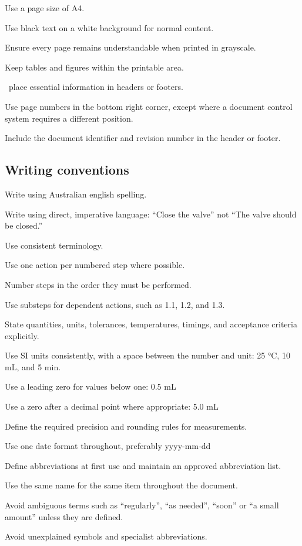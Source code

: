 Use a page size of A4.

Use black text on a white background for normal content.

Ensure every page remains understandable when printed in grayscale.

Keep tables and figures within the printable area.

\donot~place essential information in headers or footers.

Use page numbers in the bottom right corner, except where a document control system requires a different position.

Include the document identifier and revision number in the header or footer.

\subsection{Writing conventions}

Write using Australian english spelling.

Write using direct, imperative language: “Close the valve” not “The valve should be closed.”

Use consistent terminology.

Use one action per numbered step where possible.

Number steps in the order they must be performed.

Use substeps for dependent actions, such as 1.1, 1.2, and 1.3.

State quantities, units, tolerances, temperatures, timings, and acceptance criteria explicitly.

Use SI units consistently, with a space between the number and unit: 25 °C, 10 mL, and 5 min.

Use a leading zero for values below one: 0.5 mL

Use a zero after a decimal point where appropriate: 5.0 mL

Define the required precision and rounding rules for measurements.

Use one date format throughout, preferably yyyy-mm-dd

Define abbreviations at first use and maintain an approved abbreviation list.

Use the same name for the same item throughout the document.

Avoid ambiguous terms such as “regularly”, “as needed”, “soon” or “a small amount” unless they are defined.

Avoid unexplained symbols and specialist abbreviations.

